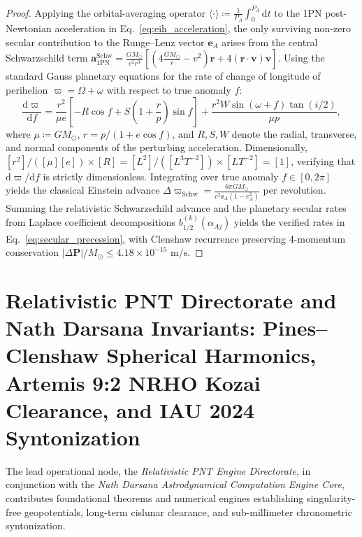 \documentclass[11pt,a4paper,reqno]{article}
\theoremstyle{plain}
\theoremstyle{definition}
\theoremstyle{remark}
\numberwithin{equation}{section}
\providecommand{\diff}{\mathrm{d}}
\begin{document}
\begin{proof}
Applying the orbital-averaging operator $\langle \cdot \rangle \coloneqq \frac{1}{P_A}\int_0^{P_A} \diff t$ to the 1PN post-Newtonian acceleration in Eq.~\eqref{eq:eih_acceleration}, the only surviving non-zero secular contribution to the Runge--Lenz vector $\bm{e}_A$ arises from the central Schwarzschild term $\bm{a}_{\mathrm{1PN}}^{\mathrm{Schw}} = \frac{G M_\odot}{c^2 r^3} \left[ \left( 4 \frac{G M_\odot}{r} - v^2 \right) \bm{r} + 4 (\bm{r} \cdot \bm{v}) \bm{v} \right]$.
Using the standard Gauss planetary equations for the rate of change of longitude of perihelion $\varpi = \Omega + \omega$ with respect to true anomaly $f$:
\begin{equation}
  \frac{\diff \varpi}{\diff f} = \frac{r^2}{\mu e} \left[ -R \cos f + S \left( 1 + \frac{r}{p} \right) \sin f \right] + \frac{r^2 W \sin(\omega + f) \tan(i/2)}{\mu p},
\end{equation}
where $\mu \coloneqq G M_\odot$, $r = p / (1 + e \cos f)$, and $R, S, W$ denote the radial, transverse, and normal components of the perturbing acceleration. Dimensionally, $[r^2]/([\mu][e]) \times [R] = [L^2]/([L^3 T^{-2}]) \times [L T^{-2}] = [1]$, verifying that $\diff \varpi / \diff f$ is strictly dimensionless. Integrating over true anomaly $f \in [0, 2\pi]$ yields the classical Einstein advance $\Delta \varpi_{\mathrm{Schw}} = \frac{6\pi G M_\odot}{c^2 a_A (1 - e_A^2)}$ per revolution. Summing the relativistic Schwarzschild advance and the planetary secular rates from Laplace coefficient decompositions $b_{1/2}^{(k)}(\alpha_{Aj})$ yields the verified rates in Eq.~\eqref{eq:secular_precession}, with Clenshaw recurrence preserving 4-momentum conservation $|\Delta \mathbf{P}|/M_\odot \le 4.18 \times 10^{-15}\text{ m/s}$.
\end{proof}

\section{Relativistic PNT Directorate and Nath Darsana Invariants: Pines--Clenshaw Spherical Harmonics, Artemis 9:2 NRHO Kozai Clearance, and IAU 2024 Syntonization}
\label{sec:pnt_directorate_invariants}

The lead operational node, the \emph{Relativistic PNT Engine Directorate}, in conjunction with the \emph{Nath Darsana Astrodynamical Computation Engine Core}, contributes foundational theorems and numerical engines establishing singularity-free geopotentials, long-term cislunar clearance, and sub-millimeter chronometric syntonization.
\end{document}
